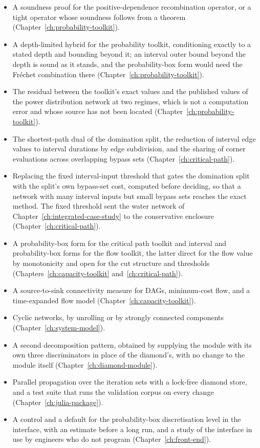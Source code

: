 \documentclass[12pt]{report}
\begin{document}
\begin{itemize}
  \item A soundness proof for the positive-dependence recombination operator, or a tight
    operator whose soundness follows from a theorem (Chapter~\ref{ch:probability-toolkit}).
  \item A depth-limited hybrid for the probability toolkit, conditioning exactly to a stated
    depth and bounding beyond it; an interval outer bound beyond the depth is sound as it
    stands, and the probability-box form would need the Fr\'{e}chet combination there
    (Chapter~\ref{ch:probability-toolkit}).
  \item The residual between the toolkit's exact values and the published values of the
    power distribution network at two regimes, which is not a computation error and whose
    source has not been located (Chapter~\ref{ch:probability-toolkit}).
  \item The shortest-path dual of the domination split, the reduction of interval edge
    values to interval durations by edge subdivision, and the sharing of corner
    evaluations across overlapping bypass sets (Chapter~\ref{ch:critical-path}).
  \item Replacing the fixed interval-input threshold that gates the domination split with
    the split's own bypass-set cost, computed before deciding, so that a network with many
    interval inputs but small bypass sets reaches the exact method. The fixed threshold sent
    the water network of Chapter~\ref{ch:integrated-case-study} to the conservative
    enclosure (Chapter~\ref{ch:critical-path}).
  \item A probability-box form for the critical path toolkit and interval and
    probability-box forms for the flow toolkit, the latter direct for the flow value by
    monotonicity and open for the cut structure and thresholds
    (Chapters~\ref{ch:capacity-toolkit} and~\ref{ch:critical-path}).
  \item A source-to-sink connectivity measure for DAGs, minimum-cost flow, and a
    time-expanded flow model (Chapter~\ref{ch:capacity-toolkit}).
  \item Cyclic networks, by unrolling or by strongly connected components
    (Chapter~\ref{ch:system-model}).
  \item A second decomposition pattern, obtained by supplying the module with its own
    three discriminators in place of the diamond's, with no change to the module itself
    (Chapter~\ref{ch:diamond-module}).
  \item Parallel propagation over the iteration sets with a lock-free diamond store, and a
    test suite that runs the validation corpus on every change
    (Chapter~\ref{ch:julia-package}).
  \item A control and a default for the probability-box discretisation level in the
    interface, with an estimate before a long run, and a study of the interface in use by
    engineers who do not program (Chapter~\ref{ch:front-end}).
\end{itemize}
\end{document}
